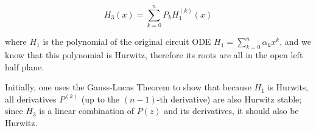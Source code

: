 \begin{equation} H_3(x) = \sum_{k=0}^n P_k H_1^{(k)}(x) \label{eq:h3_h1_rel}\end{equation}

	\noindent where $H_1$ is the polynomial of the original circuit ODE $H_1 = \sum_{k=0}^n \alpha_kx^k$, and we know that this polynomial is Hurwitz, therefore its roots are all in the open left half plane.

	Initially, one uses the Gauss-Lucas Theorem to show that because $H_1$ is Hurwits, all derivatives $P^{(k)}$ (up to the $(n-1)$-th derivative) are also Hurwitz stable; since $H_3$ is a linear combination of $P(z)$ and its derivatives, it should also be Hurwitz.


